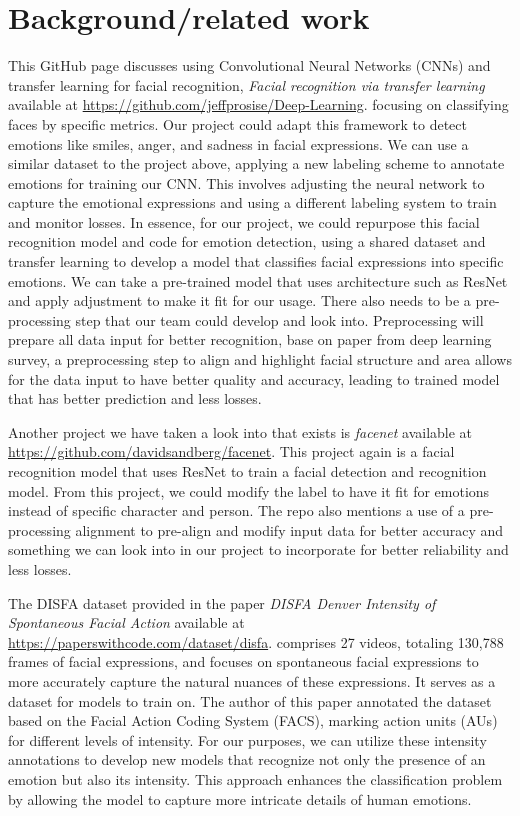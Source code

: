 \documentclass{article} %
\begin{document}
\section{Background/related work}

This GitHub page discusses using Convolutional Neural Networks (CNNs) and transfer learning for facial recognition, 
\textit{Facial recognition via transfer learning} \cite{Jeffprosise} available at
\url{https://github.com/jeffprosise/Deep-Learning}. 
focusing on classifying faces by specific metrics. Our project could adapt this framework to detect emotions like smiles, anger, and sadness in facial expressions. We can use a similar dataset to the project above, applying a new labeling scheme to annotate emotions for training our CNN.  This involves adjusting the neural network to capture the emotional expressions and using a different labeling system to train and monitor losses. In essence, for our project, we could repurpose this facial recognition model and code for emotion detection, using a shared dataset and transfer learning to develop a model that classifies facial expressions into specific emotions. We can take a pre-trained model that uses architecture such as ResNet and apply adjustment to make it fit for our usage. There also needs to be a pre-processing step that our team could develop and look into. Preprocessing will  prepare all data input for better recognition, base on paper from deep learning survey, a preprocessing step to align and highlight facial structure and area allows for the data input to have better quality and accuracy, leading to trained model that has better prediction and less losses.

Another project we have taken a look into that exists is 
\textit{facenet} \cite{Davidsandberg} available at
\url{https://github.com/davidsandberg/facenet}.
 This project again is a facial recognition model that uses ResNet to train a facial detection and recognition model. From this project, we could modify the label to have it fit for emotions instead of specific character and person. The repo also mentions a use of a pre-processing alignment to pre-align and modify input data for better accuracy and something we can look into in our project to incorporate for better reliability and less losses.

The DISFA dataset provided in the paper 
\textit{DISFA Denver Intensity of Spontaneous Facial Action} \cite{SeyedMohammad} available at
\url{https://paperswithcode.com/dataset/disfa}. 
comprises 27 videos, totaling 130,788 frames of facial expressions, and focuses on spontaneous facial expressions to more accurately capture the natural nuances of these expressions. It serves as a dataset for models to train on. The author of this paper annotated the dataset based on the Facial Action Coding System (FACS), marking action units (AUs) for different levels of intensity. For our purposes, we can utilize these intensity annotations to develop new models that recognize not only the presence of an emotion but also its intensity. This approach enhances the classification problem by allowing the model to capture more intricate details of human emotions.
\end{document}
